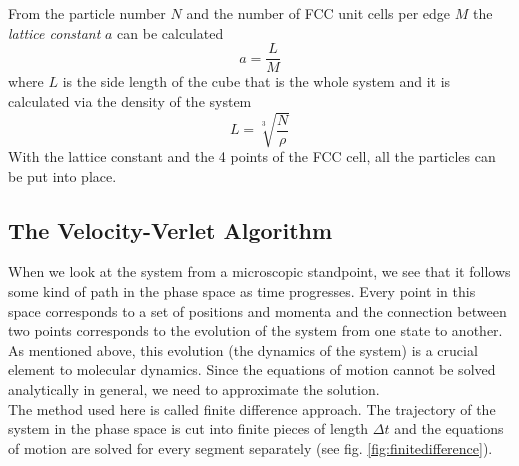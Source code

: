 \documentclass[12pt]{article}
\begin{document}
From the particle number $N$ and the number of FCC unit cells per edge $M$ the \textit{lattice constant} $a$ can be calculated
\begin{equation}
    a = \frac{L}{M}
\end{equation}
where $L$ is the side length of the cube that is the whole system and it is calculated via the density of the system
\begin{equation}
    L = \sqrt[3]{\frac{N}{\rho}}
\end{equation}
With the lattice constant and the 4 points of the FCC cell, all the particles can be put into place.

\subsection{The Velocity-Verlet Algorithm}
\label{section:verlet}
When we look at the system from a microscopic standpoint, we see that it follows some kind of path in the phase space as time progresses. Every
point in this space corresponds to a set of positions and momenta and the connection between two points corresponds to the evolution of the system
from one state to another. As mentioned above, this evolution (the dynamics of the system) is a crucial element to molecular dynamics. Since the
equations of motion cannot be solved analytically in general, we need to approximate the solution.\\
The method used here is called finite difference approach. The trajectory of the system in the phase space is cut into finite pieces of length $\Delta
t$ and the equations of motion are solved for every segment separately (see fig. \ref{fig:finitedifference}).\\
\end{document}
